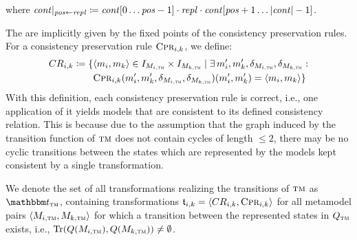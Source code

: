 where $\mathit{cont}|_{\mathit{pos} \gets \mathit{repl}} \coloneqq \mathit{cont}[0 \dots \mathit{pos}-1] \cdot \mathit{repl} \cdot \mathit{cont}[\mathit{pos}+1 \dots \lvert\mathit{cont}\rvert-1]$.

The \modellevelconsistencyrelations are implicitly given by the fixed points of the consistency preservation rules.
For a consistency preservation rule $\textsc{Cpr}_{i,k}$, we define:
\begin{align*}
    \consistencyrelation{CR}{i,k} \equalsperdefinition \setted{
    & 
    \tupled{\model{m}{i}, \model{m}{k}} \in \metamodelinstanceset{M}{i,\TuringMachine} \times \metamodelinstanceset{M}{k,\TuringMachine} \mid 
    \exists \model{m}{i}', \model{m}{k}', \change{\metamodel{M}{i,\TuringMachine}}, \change{\metamodel{M}{k,\TuringMachine}} : \\
    & 
    \consistencypreservationrule{i,k}(\model{m}{i}',\model{m}{k}',\change{\metamodel{M}{i,\TuringMachine}}, \change{\metamodel{M}{k,\TuringMachine}})(\model{m}{i}',\model{m}{k}') = \tupled{\model{m}{i}, \model{m}{k}}}
\end{align*} 
With this definition, each consistency preservation rule is correct, i.e., one application of it yields models that are consistent to its defined consistency relation.
This is because due to the assumption that the graph induced by the transition function of $\textsc{tm}$ does not contain cycles of length $\leq 2$, there may be no cyclic transitions between the states which are represented by the models kept consistent by a single transformation.

We denote the set of all transformations realizing the transitions of $\textsc{tm}$ as $\transformationset{T}_{\TuringMachine}$, containing transformations $\transformation{t}_{i,k} = \tupled{\consistencyrelation{CR}{i,k},\consistencypreservationrule{i,k}}$ for all metamodel pairs $\tupled{\metamodel{M}{i,\TuringMachine},\metamodel{M}{k,\TuringMachine}}$ for which a transition between the represented states in $Q_{\textsc{tm}}$ exists, i.e., $\Tr(Q(\metamodel{M}{i,\TuringMachine}),Q(\metamodel{M}{k,\TuringMachine})) \neq \emptyset$.

